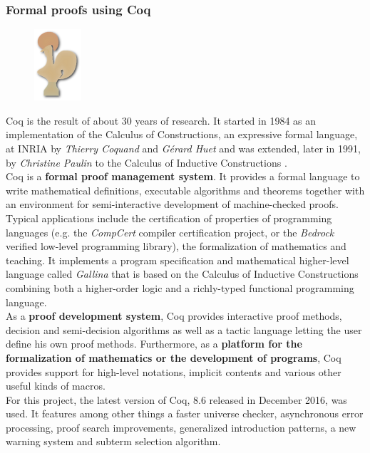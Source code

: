 \subsubsection{Formal proofs using Coq} 
\begin{figure}
\vspace{-14pt}
\centering
\includegraphics[frame]{img/CoqLogo.png}
\end{figure}
Coq \cite{CoqWeb} is the result of about 30 years of research. It started in 1984 as an implementation of the Calculus of Constructions, an expressive formal language, at INRIA by \textit{Thierry Coquand} and \textit{G\'erard Huet} and was extended, later in 1991, by \textit{Christine Paulin} to the Calculus of Inductive Constructions \cite{Calculus}. \\

Coq is a \textbf{formal proof management system}. It provides a formal language to write mathematical definitions, executable algorithms and theorems together with an environment for semi-interactive development of machine-checked proofs. Typical applications include the certification of properties of programming languages (e.g. the \textit{CompCert} compiler certification project, or the \textit{Bedrock} verified low-level programming library), the formalization of mathematics and teaching. It implements a program specification and mathematical higher-level language called \textit{Gallina} that is based on the Calculus of Inductive Constructions combining both a higher-order logic and a richly-typed functional programming language.\\

As a \textbf{proof development system}, Coq provides interactive proof methods, decision and semi-decision algorithms as well as a tactic language letting the user define his own proof methods. Furthermore, as a \textbf{platform for the formalization of mathematics or the development of programs}, Coq provides support for high-level notations, implicit contents and various other useful kinds of macros.\\

For this project, the latest version of Coq, 8.6 released in December 2016, was used. It features among other things a faster universe checker, asynchronous error processing, proof search improvements, generalized introduction patterns, a new warning system and subterm selection algorithm. \\

